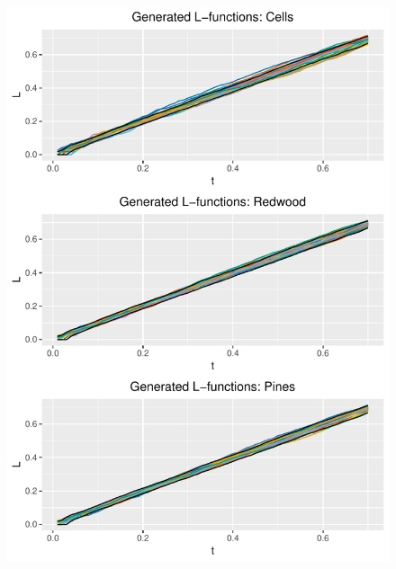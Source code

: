 \begin{figure}
    \centering
    \includegraphics[scale=0.95]{figures/prob1_samples.pdf}
    \caption{}
    \label{fig:poiss_samps}
\end{figure}

